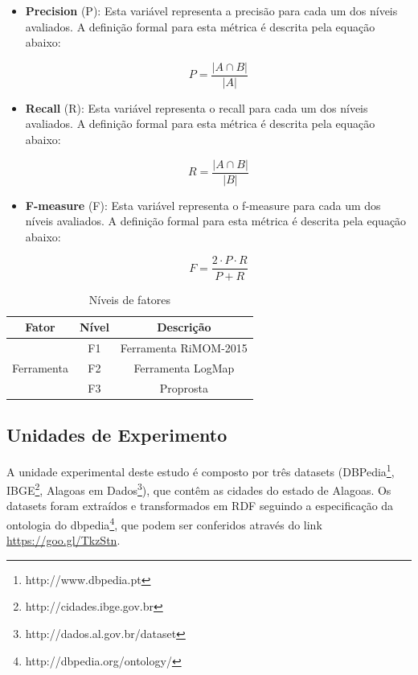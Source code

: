 \begin{itemize}
\item \textbf{Precision} (P): Esta variável representa a precisão para cada um dos níveis avaliados. A definição formal para esta métrica é descrita pela equação abaixo:

\begin{equation}
P = \dfrac{|{A}\cap{B}|}{|A|}
\end{equation}

\item \textbf{Recall} (R): Esta variável representa o recall para cada um dos níveis avaliados. A definição formal para esta métrica é descrita pela equação abaixo:

\begin{equation}
R = \dfrac{|{A}\cap{B}|}{|B|}
\end{equation}

\item \textbf{F-measure} (F): Esta variável representa o f-measure para cada um dos níveis avaliados. A definição formal para esta métrica é descrita pela equação abaixo:

\begin{equation}
F = \dfrac{{2}\cdot{P}\cdot{R}}{P+R}
\end{equation}

\end{itemize}

\begin{table}[]
\centering
\caption{Níveis de fatores}
\label{tab:factor_levels}
\begin{tabular}{|c|c|c|}
\hline
\textbf{Fator}              & \textbf{Nível} & \textbf{Descrição}    \\ \hline
\multirow{3}{*}{Ferramenta} & F1             & Ferramenta RiMOM-2015 \\ \cline{2-3} 
                            & F2             & Ferramenta LogMap     \\ \cline{2-3} 
                            & F3             & Proprosta             \\ \hline
\end{tabular}
\end{table}

\subsection*{Unidades de Experimento}
A unidade experimental deste estudo é composto por três datasets (DBPedia\footnote{http://www.dbpedia.pt}, IBGE\footnote{http://cidades.ibge.gov.br
}, Alagoas em Dados\footnote{http://dados.al.gov.br/dataset}), que contêm as cidades do estado de Alagoas. Os datasets  foram extraídos e transformados em RDF  seguindo a especificação da ontologia do dbpedia\footnote{http://dbpedia.org/ontology/}, que podem ser conferidos através do link \url{https://goo.gl/TkzStn}.

